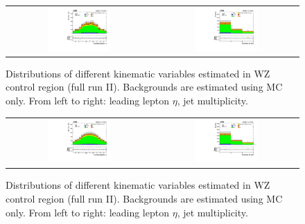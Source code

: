 \begin{figure}[tbh!]
 \begin{center}
 \begin{tabular}{cc}
 \includegraphics[width=0.45\textwidth]{figures/Part3/Selection/WZ/eee/lep1Eta}&
 \includegraphics[width=0.45\textwidth]{figures/Part3/Selection/WZ/eee/njet} \\
 \end{tabular}
 \caption{Distributions of different kinematic variables estimated in WZ control region (full run II). Backgrounds are estimated using MC only. From left to right: leading lepton $\eta$, jet multiplicity.}
 \label{fig:WZ_eee}
 \end{center}
\end{figure}

\begin{figure}[tbh!]
 \begin{center}
 \begin{tabular}{cc}
 \includegraphics[width=0.45\textwidth]{figures/Part3/Selection/WZ/emul/lep1Eta}&
 \includegraphics[width=0.45\textwidth]{figures/Part3/Selection/WZ/emul/njet} \\
 \end{tabular}
 \caption{Distributions of different kinematic variables estimated in WZ control region (full run II). Backgrounds are estimated using MC only. From left to right: leading lepton $\eta$, jet multiplicity.}
 \label{fig:WZ_emul}
 \end{center}
\end{figure}

